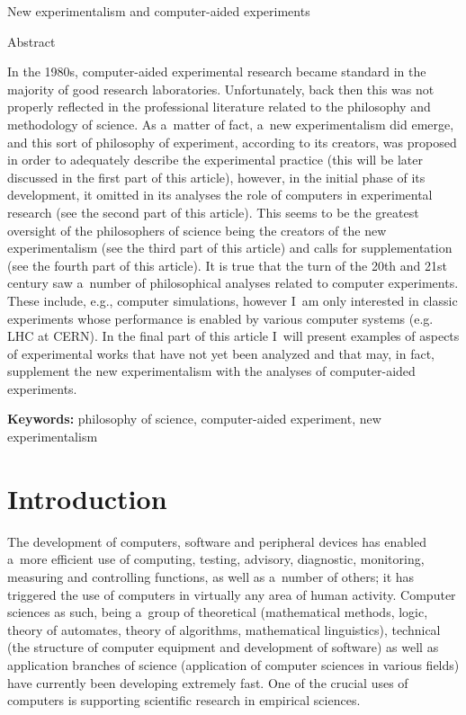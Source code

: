\setcounter{secnumdepth}{0}












New experimentalism and computer-aided experiments



Abstract



In the 1980s, computer{}-aided experimental research became standard in the majority of good research laboratories. Unfortunately, back then this was not properly reflected in the professional literature related to the philosophy and methodology of science. As a~matter of fact, a~new experimentalism did emerge, and this sort of philosophy of experiment, according to its creators, was proposed in order to adequately describe the experimental practice (this will be later discussed in the first part of this article), however, in the initial phase of its development, it omitted in its analyses the role of computers in experimental research (see the second part of this article). This seems to be the greatest oversight of the philosophers of science being the creators of the new experimentalism (see the third part of this article) and calls for supplementation (see the fourth part of this article). It is true that the turn of the 20th and 21st century saw a~number of philosophical analyses related to computer experiments.\textcolor[rgb]{0.3254902,0.5058824,0.20784314}{ }These include, e.g., computer simulations, however I~am only interested in classic experiments whose performance is enabled by various computer systems (e.g. LHC at CERN). In the final part of this article I~will present examples of aspects of experimental works that have not yet been analyzed and that may, in fact, supplement the new experimentalism with the analyses of computer-aided experiments.



\textbf{Keywords:} philosophy of science, computer-aided experiment, new experimentalism



\section{Introduction}

The development of computers, software and peripheral devices has enabled a~more efficient use of computing, testing, advisory, diagnostic, monitoring, measuring and controlling functions, as well as a~number of others; it has triggered the use of computers in virtually any area of human activity. Computer sciences as such, being a~group of theoretical (mathematical methods, logic, theory of automates, theory of algorithms, mathematical linguistics), technical (the structure of computer equipment and development of software) as well as application branches of science (application of computer sciences in various fields) have currently been developing extremely fast. One of the crucial uses of computers is supporting scientific research in empirical sciences.



